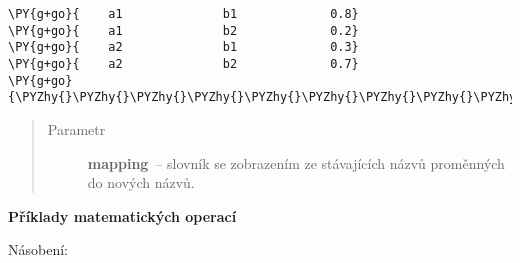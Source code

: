 \begin{fulllineitems}
\begin{fulllineitems}
\begin{Verbatim}[commandchars=\\\{\}]
\PY{g+go}{    a1              b1             0.8}
\PY{g+go}{    a1              b2             0.2}
\PY{g+go}{    a2              b1             0.3}
\PY{g+go}{    a2              b2             0.7}
\PY{g+go}{\PYZhy{}\PYZhy{}\PYZhy{}\PYZhy{}\PYZhy{}\PYZhy{}\PYZhy{}\PYZhy{}\PYZhy{}\PYZhy{}\PYZhy{}\PYZhy{}\PYZhy{}\PYZhy{}\PYZhy{}\PYZhy{}\PYZhy{}\PYZhy{}\PYZhy{}\PYZhy{}\PYZhy{}\PYZhy{}\PYZhy{}\PYZhy{}\PYZhy{}\PYZhy{}\PYZhy{}\PYZhy{}\PYZhy{}\PYZhy{}\PYZhy{}\PYZhy{}\PYZhy{}\PYZhy{}\PYZhy{}\PYZhy{}\PYZhy{}\PYZhy{}\PYZhy{}\PYZhy{}\PYZhy{}\PYZhy{}\PYZhy{}\PYZhy{}\PYZhy{}\PYZhy{}\PYZhy{}\PYZhy{}\PYZhy{}\PYZhy{}}
\end{Verbatim}
\begin{quote}\begin{description}
\item[{Parametr}] \leavevmode
\textbf{mapping}~-- slovník se zobrazením ze stávajících názvů proměnných do nových názvů.

\end{description}\end{quote}

\end{fulllineitems}


\textbf{Příklady matematických operací}

Násobení:


\end{fulllineitems}
